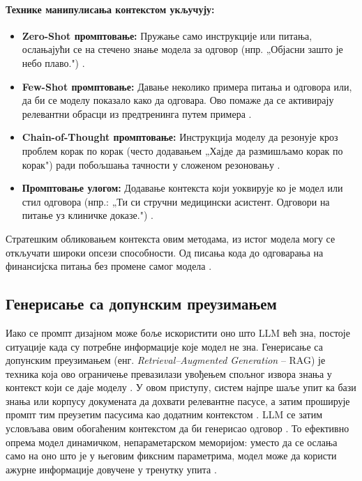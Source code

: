 \paragraph{Технике манипулисања контекстом укључују:}

\begin{itemize}
  \item \textbf{Zero-Shot промптовање:} Пружање само инструкције или питања, ослањајући се на стечено знање модела за одговор (нпр. „Објасни зашто је небо плаво.") \cite{sahoo_systematic_2025}.
  \item \textbf{Few-Shot промптовање:} Давање неколико примера питања и одговора или, да би се моделу показало како да одговара. Ово помаже да се активирају релевантни обрасци из предтренинга путем примера \cite{sahoo_systematic_2025}.
  \item \textbf{Chain-of-Thought промптовање:} Инструкција моделу да резонује кроз проблем корак по корак (често додавањем „Хајде да размишљамо корак по корак") ради побољшања тачности у сложеном резоновању \cite{sahoo_systematic_2025}.
  \item \textbf{Промптовање улогом:} Додавање контекста који уоквирује ко је модел или стил одговора (нпр.: „Ти си стручни медицински асистент. Одговори на питање уз клиничке доказе.") \cite{sahoo_systematic_2025}.
\end{itemize}

Стратешким обликовањем контекста овим методама, из истог модела могу се откључати широки опсези способности. Од писања кода до одговарања на финансијска питања без промене самог модела \cite{sahoo_systematic_2025}.

\subsection{Генерисање са допунским преузимањем}

Иако се промпт дизајном може боље искористити оно што LLM већ зна, постоје ситуације када су потребне информације које модел не зна. Генерисање са допунским преузимањем (енг. \textit{Retrieval--Augmented Generation} -- RAG) је техника која ово ограничење превазилази увођењем спољног извора знања у контекст који се даје моделу \cite{lewis_retrieval_2020}. У овом приступу, систем најпре шаље упит ка бази знања или корпусу докумената да дохвати релевантне пасусе, а затим проширује промпт тим преузетим пасусима као додатним контекстом \cite{lewis_retrieval_2020}. LLM се затим условљава овим обогаћеним контекстом да би генерисао одговор \cite{lewis_retrieval_2020}. То ефективно опрема модел динамичком, непараметарском меморијом: уместо да се ослања само на оно што је у његовим фиксним параметрима, модел може да користи ажурне информације довучене у тренутку упита \cite{lewis_retrieval_2020}.
\newline

